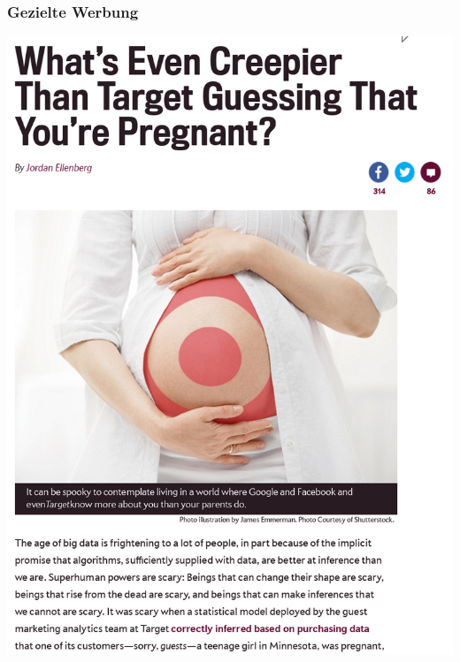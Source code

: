 \documentclass[12pt]{beamer}
\begin{document}
\begin{frame}
  \frametitle{Gezielte Werbung}
  \pause
  \begin{center}
    \includegraphics[height=0.8\textheight]{img/pregnant.png}
  \end{center}
\end{frame}
\end{document}

